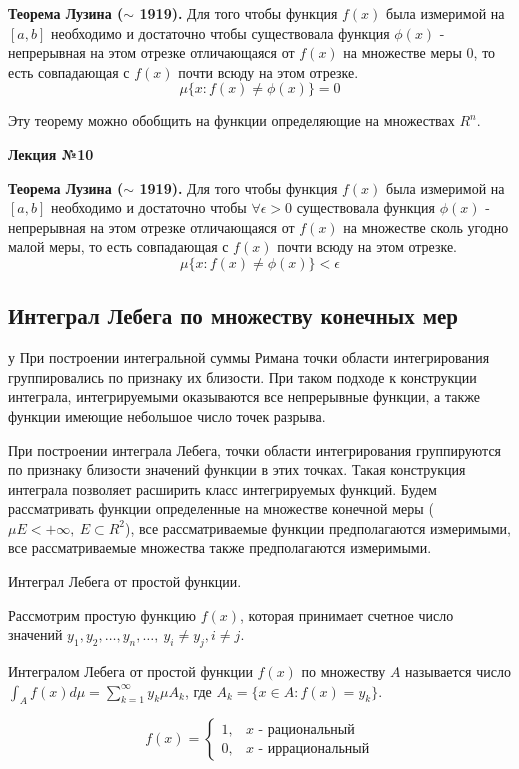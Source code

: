 \documentclass[14pt,a4paper]{extarticle}
\theoremstyle{definition}
\theoremstyle{remark}
\renewcommand{\[}{\begin{dmath*}[compact]}
\renewcommand{\]}{\end{dmath*}}
\newcommand{\sep}{ , \ \allowbreak }
\newcommand{\tth}[1][]{\textbf{Теорема#1.}}
\begin{document}
\tth[ Лузина ($\sim$ 1919)] Для того чтобы функция $f(x)$ была измеримой на $[a,b]$ необходимо и достаточно чтобы существовала функция $\phi(x)$ - непрерывная на этом отрезке отличающаяся от $f(x)$ на множестве меры 0, то есть совпадающая с $f(x)$ почти всюду на этом отрезке.
\[\mu\{x:f(x) \neq \phi (x)\} = 0\]

Эту теорему можно обобщить на функции определяющие на множествах $R^n$.

\textbf{Лекция №10}

\tth[ Лузина ($\sim$ 1919)] Для того чтобы функция $f(x)$ была измеримой на $[a,b]$ необходимо и достаточно чтобы $\forall \epsilon > 0$ существовала функция $\phi(x)$ - непрерывная на этом отрезке отличающаяся от $f(x)$ на множестве сколь угодно малой меры, то есть совпадающая с $f(x)$ почти всюду на этом отрезке.
\[\mu\{x:f(x) \neq \phi (x)\} < \epsilon\]

\subsection{Интеграл Лебега по множеству конечных мер}
у
При построении интегральной суммы Римана точки области интегрирования группировались по признаку их близости. При таком подходе к конструкции интеграла, интегрируемыми оказываются все непрерывные функции, а также функции имеющие небольшое число точек разрыва.

При построении интеграла Лебега, точки области интегрирования группируются по признаку близости значений функции в этих точках. Такая конструкция интеграла позволяет расширить класс интегрируемых функций. Будем рассматривать функции определенные на множестве конечной меры ($\mu E < +\infty \sep E \subset R^2$), все рассматриваемые функции предполагаются измеримыми, все рассматриваемые множества также предполагаются измеримыми.

Интеграл Лебега от простой функции.

Рассмотрим простую функцию $f(x)$, которая принимает счетное число значений $y_1, y_2, \dots, y_n, \dots \sep y_i \neq y_j, i\neq j$.

Интегралом Лебега от простой функции $f(x)$ по множеству $A$ называется число $\int_A f(x) d\mu = \sum_{k=1}^\infty y_k\mu A_k$, где $A_k=\{x\in A:f(x)=y_k\}$.

\[f(x) = \begin{cases} 1, & x\text{ - рациональный} \\ 0, & x\text{ - иррациональный} \end{cases}\]
\end{document}
